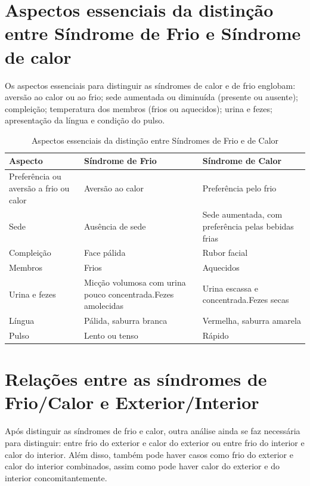 \documentclass[12pt,oneside,a4paper]{book} %
\begin{document}
\section{Aspectos essenciais da distinção entre Síndrome de Frio e Síndrome de calor}
Os aspectos essenciais para distinguir as síndromes de calor e de frio englobam: aversão ao calor ou ao frio; sede aumentada ou diminuída (presente ou ausente); compleição; temperatura dos membros (frios ou aquecidos); urina e fezes; apresentação da língua e condição do pulso.
\begin{table}[ht]
	
	\centering
	{\renewcommand\arraystretch{1.25}
		\caption{Aspectos essenciais da distinção entre Síndromes de Frio e de Calor}}
		\vspace{0.5cm}

		\begin{tabular}{l p{5.5cm} p{5.5cm}}
			
			\hline
			
			Aspecto & 
			Síndrome de Frio &
			Síndrome de Calor				
			\\ \hline \hline
			  
			Preferência ou aversão a frio ou calor &
			Aversão ao calor &
			Preferência pelo frio
			\\  
			  
			Sede &
			Ausência de sede &
			Sede aumentada, com preferência pelas bebidas frias
			\\  
			  
			Compleição &
			Face pálida &
			Rubor facial
			\\  
			  
			Membros &
			Frios &
			Aquecidos
			\\  
			  
			Urina e fezes &
			Micção volumosa com urina pouco concentrada.Fezes amolecidas &
			Urina escassa e concentrada.Fezes secas
			\\  
			  
			Língua &
			Pálida, saburra branca &
			Vermelha, saburra amarela
			\\  
			  
			Pulso &
			Lento ou tenso &
			Rápido
			\\  
			\hline
			
	\end{tabular}
	
	
\end{table} 

\section{Relações entre as síndromes de Frio/Calor e Exterior/Interior}
Após distinguir as síndromes de frio e calor, outra análise ainda se faz necessária para distinguir: entre frio do exterior e calor do exterior ou entre frio do interior e calor do interior.
Além disso, também pode haver casos como frio do exterior e calor do interior combinados, assim como pode haver calor do exterior e do interior concomitantemente.
\end{document}
